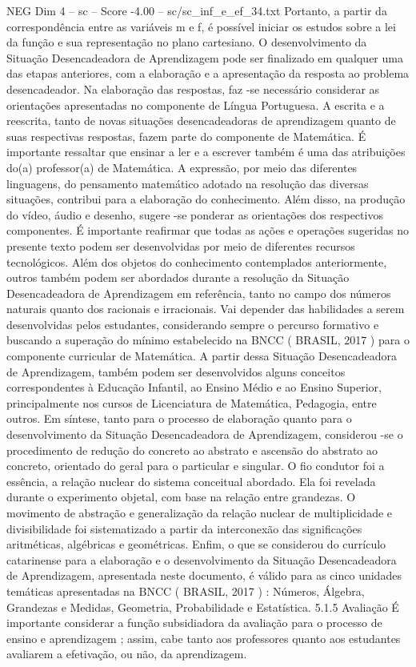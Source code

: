 \begin{textsample}{NEG Dim 4 – sc – Score -4.00 – sc/sc\_inf\_e\_ef\_34.txt}
Portanto, a partir da correspondência entre as variáveis m e f, é possível iniciar os estudos sobre a lei da função e sua representação no plano cartesiano.
O desenvolvimento da Situação Desencadeadora de Aprendizagem pode ser finalizado em qualquer uma das etapas anteriores, com a elaboração e a apresentação da resposta ao problema desencadeador.
Na elaboração das respostas, faz -se necessário considerar as orientações apresentadas no componente de Língua Portuguesa.
A escrita e a reescrita, tanto de novas situações desencadeadoras de aprendizagem quanto de suas respectivas respostas, fazem parte do componente de Matemática.
É importante ressaltar que ensinar a ler e a escrever também é uma das atribuições do(a) professor(a) de Matemática.
A expressão, por meio das diferentes linguagens, do pensamento matemático adotado na resolução das diversas situações, contribui para a elaboração do conhecimento.
Além disso, na produção do vídeo, áudio e desenho, sugere -se ponderar as orientações dos respectivos componentes.
É importante reafirmar que todas as ações e operações sugeridas no presente texto podem ser desenvolvidas por meio de diferentes recursos tecnológicos.
Além dos objetos do conhecimento contemplados anteriormente, outros também podem ser abordados durante a resolução da Situação Desencadeadora de Aprendizagem em referência, tanto no campo dos números naturais quanto dos racionais e irracionais.
Vai depender das habilidades a serem desenvolvidas pelos estudantes, considerando sempre o percurso formativo e buscando a superação do mínimo estabelecido na BNCC ( BRASIL, 2017 ) para o componente curricular de Matemática.
A partir dessa Situação Desencadeadora de Aprendizagem, também podem ser desenvolvidos alguns conceitos correspondentes à Educação Infantil, ao Ensino Médio e ao Ensino Superior, principalmente nos cursos de Licenciatura de Matemática, Pedagogia, entre outros.
Em síntese, tanto para o processo de elaboração quanto para o desenvolvimento da Situação Desencadeadora de Aprendizagem, considerou -se o procedimento de redução do concreto ao abstrato e ascensão do abstrato ao concreto, orientado do geral para o particular e singular.
O fio condutor foi a essência, a relação nuclear do sistema conceitual abordado.
Ela foi revelada durante o experimento objetal, com base na relação entre grandezas.
O movimento de abstração e generalização da relação nuclear de multiplicidade e divisibilidade foi sistematizado a partir da interconexão das significações aritméticas, algébricas e geométricas.
Enfim, o que se considerou do currículo catarinense para a elaboração e o desenvolvimento da Situação Desencadeadora de Aprendizagem, apresentada neste documento, é válido para as cinco unidades temáticas apresentadas na BNCC ( BRASIL, 2017 ) : Números, Álgebra, Grandezas e Medidas, Geometria, Probabilidade e Estatística. 5.1.5 Avaliação É importante considerar a função subsidiadora da avaliação para o processo de ensino e aprendizagem ; assim, cabe tanto aos professores quanto aos estudantes avaliarem a efetivação, ou não, da aprendizagem.

\end{textsample}
